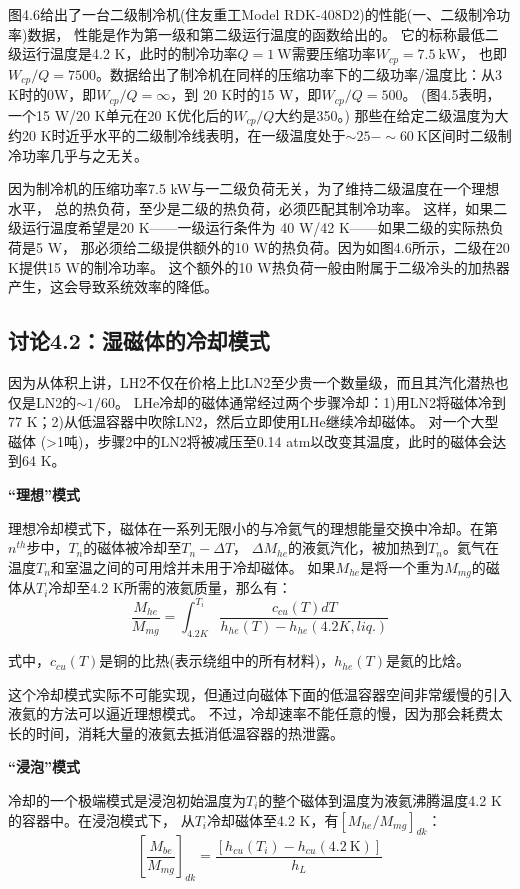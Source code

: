 图4.6给出了一台二级制冷机(住友重工Model RDK-408D2)的性能(一、二级制冷功率)数据，
性能是作为第一级和第二级运行温度的函数给出的。
它的标称最低二级运行温度是4.2 K，此时的制冷功率$Q=1\ \mathrm{W}$需要压缩功率$W_{cp}=7.5\ \mathrm{kW}$，
也即$W_{cp}/Q = 7500$。数据给出了制冷机在同样的压缩功率下的二级功率/温度比：从3 K时的0W，即$W_{cp}/Q = \infty$，到
20 K时的15 W，即$W_{cp}/Q = 500$。 (图4.5表明，一个15 W/20 K单元在20 K优化后的$W_{cp}/Q$大约是350。)
那些在给定二级温度为大约20 K时近乎水平的二级制冷线表明，在一级温度处于$\sim 25-\sim 60\ \mathrm{K}$区间时二级制冷功率几乎与之无关。

因为制冷机的压缩功率7.5 kW与一二级负荷无关，为了维持二级温度在一个理想水平，
总的热负荷，至少是二级的热负荷，必须匹配其制冷功率。
这样，如果二级运行温度希望是20 K——一级运行条件为 40 W/42 K——如果二级的实际热负荷是5 W，
那必须给二级提供额外的10 W的热负荷。因为如图4.6所示，二级在20 K提供15 W的制冷功率。
这个额外的10 W热负荷一般由附属于二级冷头的加热器产生，这会导致系统效率的降低。


\subsection{讨论4.2：湿磁体的冷却模式}
因为从体积上讲，LH2不仅在价格上比LN2至少贵一个数量级，而且其汽化潜热也仅是LN2的$\sim 1/60$。
LHe冷却的磁体通常经过两个步骤冷却：1)用LN2将磁体冷到77 K；2)从低温容器中吹除LN2，然后立即使用LHe继续冷却磁体。
对一个大型磁体 (>1吨)，步骤2中的LN2将被减压至0.14 atm以改变其温度，此时的磁体会达到64 K。

\textbf{“理想”模式}

理想冷却模式下，磁体在一系列无限小的与冷氦气的理想能量交换中冷却。在第$n^{th}$步中，$T_n$的磁体被冷却至$T_n-\Delta T$，
$\Delta M_{he}$的液氦汽化，被加热到$T_n$。氦气在温度$T_n$和室温之间的可用焓并未用于冷却磁体。
如果$M_{he}$是将一个重为$M_{mg}$的磁体从$T_i$冷却至4.2 K所需的液氦质量，那么有：
\begin{equation}%
\frac{M_{he}}{M_{mg}}=\int_{4.2K}^{T_i}\frac{c_{cu}(T)dT}{h_{he}(T)-h_{he}(4.2K,liq.)}
\end{equation}

式中，$c_{cu}(T)$是铜的比热(表示绕组中的所有材料)，$h_{he}(T)$是氦的比焓。

这个冷却模式实际不可能实现，但通过向磁体下面的低温容器空间非常缓慢的引入液氦的方法可以逼近理想模式。
不过，冷却速率不能任意的慢，因为那会耗费太长的时间，消耗大量的液氦去抵消低温容器的热泄露。

\textbf{“浸泡”模式}

冷却的一个极端模式是浸泡初始温度为$T_i$的整个磁体到温度为液氦沸腾温度4.2 K的容器中。在浸泡模式下，
从$T_i$冷却磁体至4.2 K，有$[M_{he}/M_{mg}]_{dk}$：
\begin{equation}%
\left[\frac{M_{be}}{M_{mg}}\right]_{dk}=\frac{[h_{cu}(T_i)-h_{cu}(4.2\ \mathrm{K})]}{h_L}
\end{equation}

